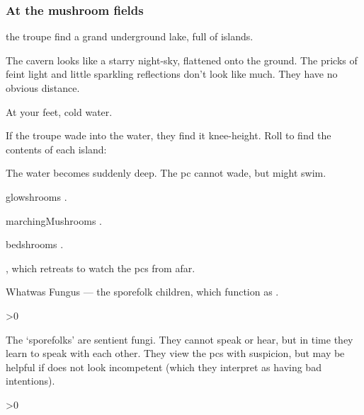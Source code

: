 \documentclass[10pt,twoside]{book}
\begin{document}
\subsubsection{At the mushroom fields}
the troupe find a grand underground lake, full of islands.

\begin{boxtext}
  The cavern looks like a starry night-sky, flattened onto the ground.
  The pricks of feint light and little sparkling reflections don't look like much.
  They have no obvious distance.

  At your feet, cold water.
\end{boxtext}

If the troupe wade into the water, they find it knee-height.
Roll to find the contents of each island:

{
  \footnotesize
  \begin{dlist}
    \item
    The water becomes suddenly deep.
    The \gls{pc} cannot wade, but might swim.
    \item
    \Glspl{glowshroom} .
    \item
    \Glspl{marchingMushroom} .
    \item
    \Glspl{bedshroom} .
    \item
    , which retreats to watch the \glspl{pc} from afar.
    \item
    Whatwas Fungus --- the \gls{sporefolk} children, which function as .
  \end{dlist}
}


\randomize
\newif\ifSporeSpells
\SporeSpellstrue

\ifodd\value{r3}\randomize\fi
\sporeFolk

\ifnum\value{Charisma}>0
  \ifSporeSpells
    {\small{}}
    \SporeSpellsfalse
  \fi
\fi

\noindent
The `\glspl{sporefolk}' are sentient fungi.%
They cannot speak or hear, but in time they learn to speak with each other.
They view the \glspl{pc} with suspicion, but may be helpful if  does not look incompetent (which they interpret as having bad intentions).

\sporeFolk

\ifnum\value{Charisma}>0
  \ifSporeSpells%
    {\small\showStdSpells[\stepcounter{enc}]}
  \fi%
\fi
\end{document}
